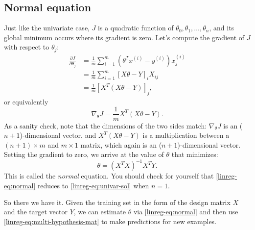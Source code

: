 \documentclass{article}
\theoremstyle{definition}
\begin{document}
\subsection{Normal equation}
Just like the univariate case, $J$ is a quadratic function of $\theta_0, \theta_1, \dots, \theta_n$, and its global minimum occurs where its gradient is zero. Let's compute the gradient of $J$ with respect to $\theta_j$:
\begin{align*}
    \frac{\partial J}{\partial \theta_j} &= \frac{1}{m}\sum_{i=1}^{m}(\theta^Tx^{(i)} - y^{(i)})x^{(i)}_j\\
    &=\frac{1}{m}\sum_{i=1}^{m}[X\theta - Y]_iX_{ij}\\
    &=\frac{1}{m}[X^T(X\theta - Y)]_j,
\end{align*}
or equivalently
\begin{equation}
    \nabla_{\theta} J = \frac{1}{m}X^T(X\theta - Y).
\end{equation}
As a sanity check, note that the dimensions of the two sides match: $\nabla_{\theta} J$ is an ($n+1$)-dimensional vector, and $X^T(X\theta - Y)$ is a multiplication between a $(n+1) \times m$ and $m \times 1$ matrix, which again is an ($n+1$)-dimensional vector. Setting the gradient to zero, we arrive at the value of $\theta$ that minimizes:
\begin{equation}
    \theta = \left(X^TX\right)^{-1}X^TY.
    \label{linreg-eq:normal}
\end{equation}
This is called the \textit{normal} equation. You should check for yourself that \eqref{linreg-eq:normal} reduces to \eqref{linreg-eq:univar-sol} when $n = 1$.

So there we have it. Given the training set in the form of the design matrix $X$ and the target vector $Y$, we can estimate $\theta$ via \eqref{linreg-eq:normal} and then use \eqref{linreg-eq:multi-hypothesis-mat} to make predictions for new examples.


\end{document}
